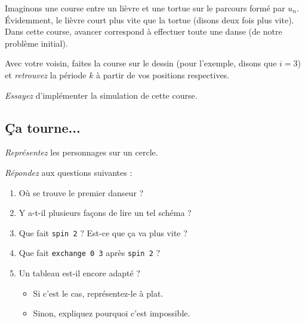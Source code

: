 Imaginons une course entre un lièvre et une tortue sur le parcours formé par
$u_n$. Évidemment, le lièvre court plus vite que la tortue (disons deux fois
plus vite). Dans cette course, avancer correspond à effectuer toute une danse
(de notre problème initial).

\begin{exo}
Avec votre voisin, faites la course sur le dessin (pour l'exemple, disons que
$i=3$) et \emph{retrouvez} la période $k$ à partir de vos positions respectives.
\end{exo}

\begin{exo}[Préparation]
\emph{Essayez} d'implémenter la simulation de cette course.
\end{exo}

\subsection{Ça tourne...}

\begin{exo}[Préparation]
\emph{Représentez} les personnages sur un cercle.
\end{exo}

\begin{exo}
\emph{Répondez} aux questions suivantes :
\begin{enumerate}
\item Où se trouve le premier danseur ?
\item Y a-t-il plusieurs façons de lire un tel schéma ?
\item Que fait \texttt{spin 2} ? Est-ce que ça va plus vite ?
\item Que fait \texttt{exchange 0 3} après \texttt{spin 2} ?
\item Un tableau est-il encore adapté ?
	\begin{itemize}
	\item Si c'est le cas, représentez-le à plat.
	\item Sinon, expliquez pourquoi c'est impossible.
	\end{itemize}
\end{enumerate}
\end{exo}

